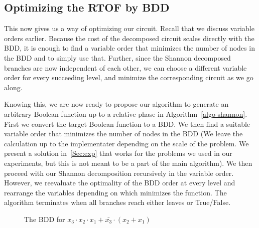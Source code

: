 \subsection{Optimizing the RTOF by BDD}
\label{Subsec:rtof-opt}

This now gives us a way of optimizing our circuit. Recall that we
discuss variable orders earlier. Because the cost of the decomposed
circuit scales directly with the BDD, it is enough to find a variable
order that minimizes the number of nodes in the BDD and to simply use
that. Further, since the Shannon decomposed branches are now
independent of each other, we can choose a different variable order
for every succeeding level, and minimize the corresponding circuit as
we go along.

Knowing this, we are now ready to propose our algorithm to generate an
arbitrary Boolean function up to a relative phase in Algorithm~\ref{algo-shannon}. 
First we convert the target Boolean function to a BDD. We then find a suitable variable order
that minimizes the number of nodes in the BDD (We leave the
calculation up to the implementater depending on the scale of the
problem. We present a solution in~\ref{Sec:exp} that works for the
problems we used in our experiments, but this is not meant to be a
part of the main algorithm). We then proceed with our Shannon
decomposition recursively in the variable order. However, we
reevaluate the optimality of the BDD order at every level and
rearrange the variables depending on which minimizes the function. The
algorithm terminates when all branches reach either leaves or
True/False.


\begin{figure}[t]
  \begin{minipage}{0.50\linewidth}
    \begin{center}
      \scalebox{1.0} {
        
      }
      \caption{The Quantum Circuit implementing Fig.~\ref{fig-lut-network} }
      \label{fig-lut-qc}
    \end{center}
  \end{minipage}
  \hspace{0.08\linewidth}
  \begin{minipage}{0.40\linewidth}
    \begin{center}
      
      \caption{The BDD for $x_3 \cdot x_2 \cdot x_1 + \bar{x_3} \cdot (x_2 + x_1)$}
      \label{fig-func-bdd}
    \end{center}
  \end{minipage}
\end{figure}
\vspace*{-0.25cm}

